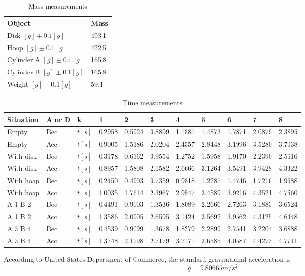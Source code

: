 \begin{table}[H]
  \centering
  \begin{tabularx}{\textwidth}{|X|X|}
    \hline
    Object & Mass\\
	\hline
    Disk $[g] \pm 0.1 [g] $ & 493.1\\
    Hoop $[g] \pm 0.1 [g] $ & 422.5\\
    Cylinder A $[g] \pm 0.1 [g] $ & 165.8\\
    Cylinder B $[g] \pm 0.1 [g] $ & 165.8\\
    Weight $[g] \pm 0.1 [g] $ & 59.1 \\
    \hline
  \end{tabularx}
  \caption{Mass measurements}
  \end{table}
\begin{table}[H]
  \centering
\begin{tabular}{|p{2cm}|p{1.5cm}|l|l|l|l|l|l|l|l|l|}
\hline
Situation & A or D & k & 1 & 2 & 3 & 4 & 5 & 6 & 7 & 8 \\
\hline
Empty & Dec & $t[s]$ & 0.2958 & 0.5924 & 0.8899 & 1.1881 & 1.4873 & 1.7871 & 2.0879 & 2.3895 \\
Empty & Acc & $t[s]$ & 0.9005 & 1.5186 & 2.0204 & 2.4557 & 2.8448 & 3.1996 & 3.5280 & 3.7038 \\
With disk & Dec &  $t[s]$ & 0.3178 & 0.6362 & 0.9554 & 1.2752 & 1.5958 & 1.9170 & 2.2390 & 2.5616 \\
With disk & Acc &  $t[s]$ & 0.8957 & 1.5808 & 2.1582 & 2.6666 & 3.1264 & 3.5491 & 3.9428 & 4.3322 \\
With hoop & Dec &  $t[s]$ & 0.2450 & 0.4903 & 0.7359 & 0.9818 & 1.2281 & 1.4746 & 1.7216 & 1.9688 \\
With hoop & Acc &  $t[s]$ & 1.0035 & 1.7614 & 2.3967 & 2.9547 & 3.4589 & 3.9216 & 4.3521 & 4.7560 \\
A 1 B 2 & Dec &  $t[s]$ & 0.4491 & 0.9003 & 1.3536 & 1.8089 & 2.2666 & 2.7263 & 3.1883 & 3.6524 \\
A 1 B 2 & Acc &  $t[s]$ & 1.3586 & 2.0905 & 2.6595 & 3.1424 & 3.5692 & 3.9562 & 4.3125 & 4.6448 \\
A 3 B 4 & Dec &  $t[s]$ & 0.4539 & 0.9099 & 1.3678 & 1.8279 & 2.2899 & 2.7541 & 3.2204 & 3.6888 \\
A 3 B 4 & Acc &  $t[s]$ & 1.3748 & 2.1298 & 2.7179 & 3.2171 & 3.6585 & 4.0587 & 4.4273 & 4.7711 \\
\hline
\end{tabular}
\caption{ Time measurements}
\end{table}

According to  United States Department of Commerce, the standard gravitational
acceleration is 
$$ g =  9.80665 m/s^2 $$




